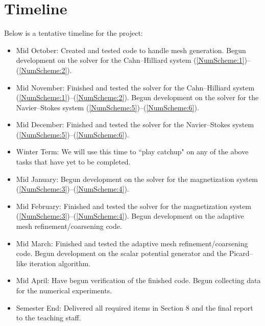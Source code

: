 \documentclass[11pt,fullpage]{article}
\theoremstyle{lemma}
\theoremstyle{definition}
\theoremstyle{lemma}
\begin{document}
\section{Timeline}
Below is a tentative timeline for the project:
\begin{itemize}
	\item Mid October: Created and tested code to handle mesh generation. Begun development on the solver for the Cahn--Hilliard system (\ref{NumScheme:1})--(\ref{NumScheme:2}).
	
	\item Mid November: Finished and tested the solver for the Cahn--Hilliard system (\ref{NumScheme:1})--(\ref{NumScheme:2}). Begun development on the solver for the Navier--Stokes system (\ref{NumScheme:5})--(\ref{NumScheme:6}).
	
	\item Mid December: Finished and tested the solver for the Navier--Stokes system (\ref{NumScheme:5})--(\ref{NumScheme:6}).
	
	\item Winter Term: We will use this time to ``play catchup" on any of the above tasks that have yet to be completed.
	
	\item Mid January: Begun development on the solver for the magnetization system (\ref{NumScheme:3})--(\ref{NumScheme:4}).
	
	\item Mid February: Finished and tested the solver for the magnetization system (\ref{NumScheme:3})--(\ref{NumScheme:4}). Begun development on the adaptive mesh refinement/coarsening code.
	
	\item Mid March: Finished and tested the adaptive mesh refinement/coarsening code. Begun development on the scalar potential generator and the Picard--like iteration algorithm.
	
	\item Mid April: Have begun verification of the finished code. Begun collecting data for the numerical experiments.
	
	\item Semester End: Delivered all required items in Section 8 and the final report to the teaching staff.
	
	
\end{itemize}


	


\end{document}
